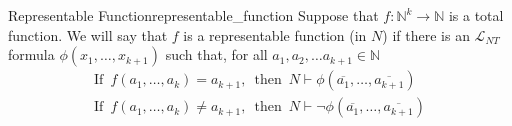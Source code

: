 \begin{definition}
{Representable Function}{representable_function}
Suppose that \(f: \mathbb{N}^{k} \rightarrow \mathbb{N}\) is a total function.
We will say that \(f\) is a representable function (in \(N\)) if there is an
\(\mathcal{L}_{N T}\) formula \(\phi\left(x_{1}, \ldots, x_{k+1}\right)\) such
that, for all \(a_{1}, a_{2}, \ldots a_{k+1} \in \mathbb{N}\)
\begin{gather*}
    \text{If} \enspace f\left(a_{1}, \ldots, a_{k}\right) = a_{k+1}, \enspace
    \text{then} \enspace N \vdash \phi\left(\overline{a_{1}}, \ldots,
    \overline{a_{k+1}}\right) \\
    \text{If} \enspace f\left(a_{1}, \ldots, a_{k}\right) \neq a_{k+1}, \enspace
    \text{then} \enspace   N \vdash \neg
    \phi\left(\overline{a_{1}}, \ldots, \overline{a_{k+1}}\right)
\end{gather*}
\end{definition}
